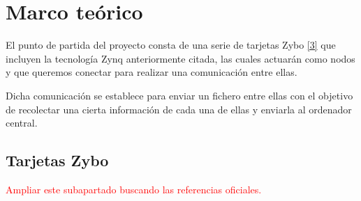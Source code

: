 \section{Marco teórico}
El punto de partida del proyecto consta de una serie de tarjetas Zybo \hyperlink{3}{[3]} que incluyen la tecnología Zynq anteriormente citada, las cuales actuarán como nodos y que queremos conectar para realizar una comunicación entre ellas.

Dicha comunicación se establece para enviar un fichero entre ellas con el objetivo de recolectar una cierta información de cada una de ellas y enviarla al ordenador central.

\subsection{Tarjetas Zybo}
\textcolor{red}{Ampliar este subapartado buscando las referencias oficiales.}
